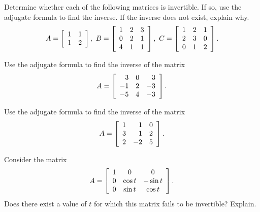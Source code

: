 \documentclass{ximera}
\begin{document}
\begin{example}
  Determine whether each of the following matrices is invertible. If
  so, use the adjugate formula to find the inverse. If the inverse
  does not exist, explain why.
  \begin{equation*}
    A = \startmat{rr}
      1 & 1 \\
      1 & 2 \\
    \stopmat,
    \quad
    B = \startmat{rrr}
      1 & 2 & 3 \\
      0 & 2 & 1 \\
      4 & 1 & 1 \\
    \stopmat,
    \quad
    C = \startmat{rrr}
      1 & 2 & 1 \\
      2 & 3 & 0 \\
      0 & 1 & 2 \\
    \stopmat.
  \end{equation*}
\end{example}

\begin{example}
  Use the adjugate formula to find the inverse of the matrix
  \begin{equation*}
    A=\startmat{rrr}
      3 & 0 & 3 \\
      -1 & 2 & -3 \\
      -5 & 4 & -3
    \stopmat.
  \end{equation*}
\end{example}

\begin{example}
  Use the adjugate formula to find the inverse of the matrix
  \begin{equation*}
    A=\startmat{rrr}
      1 &  1 & 0 \\
      3 &  1 & 2 \\
      2 & -2 & 5 \\
    \stopmat.
  \end{equation*}
\end{example}

\begin{example}
  Consider the matrix
  \begin{equation*}
    A =
    \startmat{ccc}
      1 & 0 & 0 \\
      0 & \cos t & -\sin t \\
      0 & \sin t & \cos t \\
    \stopmat.
  \end{equation*}
  Does there exist a value of $t$ for which this matrix fails to be
  invertible? Explain.
\end{example}
\end{document}
